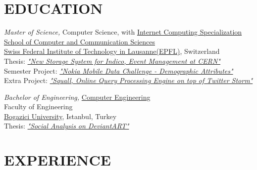 \documentclass[line, margin]{res}
\begin{document}
\address{Rue de Neuchatel 10, 1201 Geneva, Switzerland \hspace{2.7cm} (+41) 78 926 9917}
\address{\href{mailto:ferhat.elmas@epfl.ch}{ferhat.elmas@epfl.ch} \hspace{1.75cm} \href{http://ferhatelmas.com}{ferhatelmas.com} \hspace{1.75cm}  \href{https://github.com/ferhatelmas}{github.com/ferhatelmas}}
 
\begin{resume}
 
\vspace{-0.4cm} 
  
\section{EDUCATION}
	{\sl Master of Science,} Computer Science, with \href{http://ic.epfl.ch/specializations#content}{Internet Computing Specialization} \\
	\href{http://ic.epfl.ch}{School of Computer and Communication Sciences} \\
	\href{http://epfl.ch}{Swiss Federal Institute of Technology in Lausanne(EPFL)}, Switzerland \\
	Thesis: \textit{\href{http://indico-software.org/}{"New Storage System for Indico, Event Management at CERN"}} \\
	Semester Project: \textit{\href{http://research.nokia.com/page/12000}{"Nokia Mobile Data Challenge - Demographic Attributes"}} \\
	Extra Project: \textit{\href{https://github.com/epfldata/squall}{"Squall, Online Query Processing Engine on top of Twitter Storm"}}
 
	{\sl Bachelor of Engineering,} \href{http://www.cmpe.boun.edu.tr/}{Computer Engineering} \\
	Faculty of Engineering \\
	\href{http://boun.edu.tr/en-US/Content/Default.aspx}{Bogazici University}, Istanbul, Turkey \\
	Thesis: \textit{\href{https://github.com/ferhatelmas/deviantART-analysis}{"Social Analysis on DeviantART"}}  

\vspace{-0.2cm}

\section{EXPERIENCE}


\end{resume}
\end{document}
